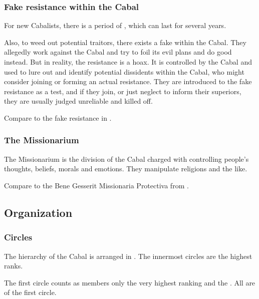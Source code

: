 \subsubsection{Fake resistance within the Cabal}
For new Cabalists, there is a period of , which can last for several years. 

Also, to weed out potential traitors, there exists a fake  within the Cabal. They allegedly work against the Cabal and try to foil its evil plans and do good instead. But in reality, the resistance is a hoax. It is controlled by the Cabal and used to lure out and identify potential dissidents within the Cabal, who might consider joining or forming an actual resistance. They are introduced to the fake resistance as a test, and if they join, or just neglect to inform their superiors, they are usually judged unreliable and killed off. 

Compare to the fake resistance in .





\subsubsection{The Missionarium}
The Missionarium is the division of the Cabal charged with controlling people's thoughts, beliefs, morals and emotions. They manipulate religions and the like. 

Compare to the Bene Gesserit Missionaria Protectiva from . 









\subsection{Organization}





\subsubsection{Circles}
The hierarchy of the Cabal is arranged in . The innermost circles are the highest ranks. 

The first circle counts as members only the very highest ranking \resphain{} and the \banelords. All \satharioth{} are of the first circle. 

